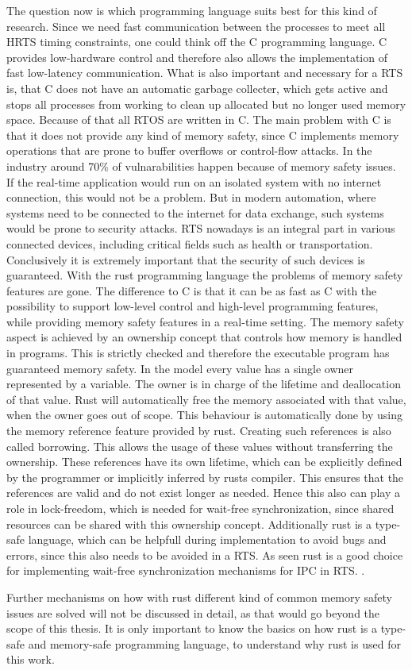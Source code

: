 The question now is which programming language suits best for this kind of research. Since we need fast communication between the processes to meet all \ac{HRTS} timing constraints, one could think off the C programming language. C provides low-hardware control and therefore also allows the implementation of fast low-latency communication. What is also important and necessary for a \ac{RTS} is, that C does not have an automatic garbage collecter, which gets active and stops all processes from working to clean up allocated but no longer used memory space. Because of that all \ac{RTOS} are written in C. The main problem with C is that it does not provide any kind of memory safety, since C implements memory operations that are prone to buffer overflows or control-flow attacks. In the industry around 70\% of vulnarabilities happen because of memory safety issues. If the real-time application would run on an isolated system with no internet connection, this would not be a problem. But in modern automation, where systems need to be connected to the internet for data exchange, such systems would be prone to security attacks. \ac{RTS} nowadays is an integral part in various connected devices, including critical fields such as health or transportation. Conclusively it is extremely important that the security of such devices is guaranteed. With the rust programming language the problems of memory safety features are gone. The difference to C is that it can be as fast as C with the possibility to support low-level control and high-level programming features, while providing memory safety features in a real-time setting. The memory safety aspect is achieved by an ownership concept that controls how memory is handled in programs. This is strictly checked and therefore the executable program has guaranteed memory safety. In the model every value has a single owner represented by a variable. The owner is in charge of the lifetime and deallocation of that value. Rust will automatically free the memory associated with that value, when the owner goes out of scope. This behaviour is automatically done by using the memory reference feature provided by rust. Creating such references is also called borrowing. This allows the usage of these values without transferring the ownership. These references have its own lifetime, which can be explicitly defined by the programmer or implicitly inferred by rusts compiler. This ensures that the references are valid and do not exist longer as needed. Hence this also can play a role in lock-freedom, which is needed for wait-free synchronization, since shared resources can be shared with this ownership concept. Additionally rust is a type-safe language, which can be helpfull during implementation to avoid bugs and errors, since this also needs to be avoided in a \ac{RTS}. As seen rust is a good choice for implementing wait-free synchronization mechanisms for \ac{IPC} in \ac{RTS}. \cite{xu2023rust, culic2022lowRust}. 

Further mechanisms on how with rust different kind of common memory safety issues are solved will not be discussed in detail, as that would go beyond the scope of this thesis. It is only important to know the basics on how rust is a type-safe and memory-safe programming language, to understand why rust is used for this work.
